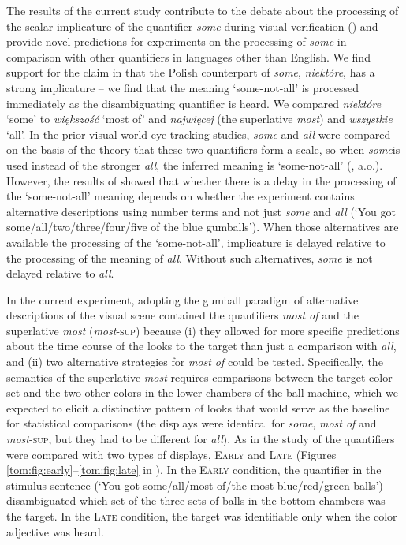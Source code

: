 \documentclass[output=paper]{langscibook}
\begin{document}
The results of the current study contribute to the debate about the processing of the scalar implicature of the
quantifier \textit{some }during visual verification (\citealt{huang2009online,grodner2010some,degen2011making,huang2011logic,degen2016availability}) and provide novel predictions for experiments on the processing of \textit{some} in
comparison with other quantifiers in languages other than English. We find support for the claim in \citet{spychalska-msc}
that the Polish counterpart of \textit{some}, \textit{niektóre}, has a strong implicature – we find that the meaning
`some-not-all' is processed immediately as the disambiguating quantifier is heard. We compared \textit{niektóre} `some'
to \textit{większość} `most of' and \textit{najwięcej} (the superlative \textit{most}) and \textit{wszystkie
} `all'. In the prior visual world eye-tracking studies, \textit{some} and \textit{all} were compared on the
basis of the theory that these two quantifiers form a scale, so when \textit{some}is used instead of the stronger
\textit{all}, the inferred meaning is `some-not-all' (\citealt{horn1972,Levinson1983}, a.o.). However, the results of \citet{degen2011making,degen2016availability} showed that whether there is a delay in the processing of the `some-not-all'
meaning depends on whether the experiment contains alternative descriptions using number terms and not just
\textit{some} and \textit{all} (`You got some/all/two/three/four/five of the blue gumballs'). When those alternatives
are available the processing of the `some-not-all', implicature is delayed relative to the processing of the
meaning of \textit{all}. Without such alternatives, \textit{some} is not delayed relative to \textit{all}. 

In the current experiment, adopting the gumball paradigm of \citet{degen2011making,degen2016availability} alternative descriptions of
the visual scene contained the quantifiers \textit{most of} and the superlative \textit{most
}(\textit{most}\textsc{-sup}) because (i) they allowed for more specific predictions about the time course of the
looks to the target than just a comparison with \textit{all}, and (ii) two alternative strategies for \textit{most of}
could be tested. Specifically, the semantics of the superlative \textit{most} requires comparisons between the target
color set and the two other colors in the lower chambers of the ball machine, which we expected to elicit a
distinctive pattern of looks that would serve as the baseline for statistical comparisons (the displays were identical
for \textit{some}, \textit{most of} and \textit{most}\textsc{-sup}, but they had to be different for \textit{all}).
As in the study of \citet{degen2016availability} the quantifiers were compared with two types of displays, \textsc{Early} and \textsc{Late}
(Figures \ref{tom:fig:early}--\ref{tom:fig:late} in ). In the \textsc{Early} condition, the quantifier in the stimulus sentence (`You got
some/all/most of/the most blue/red/green balls') disambiguated which set of the three sets of balls in
the bottom chambers was the target. In the \textsc{Late} condition, the target was identifiable only when the color adjective was
heard. 
\end{document}
